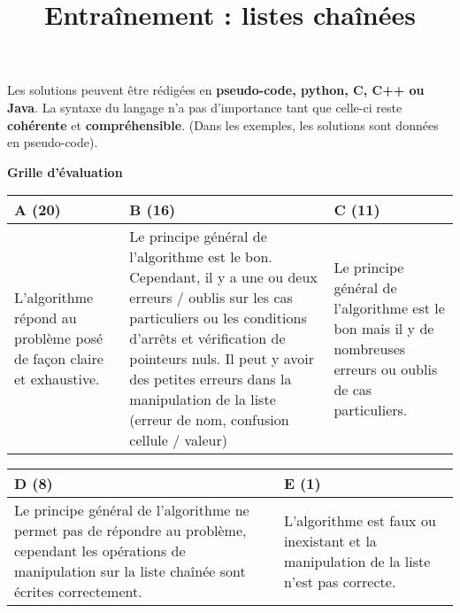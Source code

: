 \documentclass{../cours}
\title{Entraînement : listes chaînées}
\begin{document}
\maketitle

Les solutions peuvent être rédigées en \textbf{pseudo-code, python, C, C++ ou Java}. La syntaxe du langage n'a pas d'importance tant que celle-ci reste \textbf{cohérente} et \textbf{compréhensible}. (Dans les exemples, les solutions sont données en pseudo-code).

\textbf{Grille d'évaluation}

\vspace{0.5cm}

\begin{tabular}{|p{5cm}|p{5cm}|p{5cm}|}
\hline 
A (20) & B (16) & C (11) \\ \hline
\small{L’algorithme répond au problème posé de façon claire et exhaustive.}
&
\small{Le principe général de l'algorithme est le bon. Cependant, il y a une ou deux erreurs / oublis sur les cas particuliers ou les conditions d'arrêts et vérification de pointeurs nuls. Il peut y avoir des petites erreurs dans la manipulation de la liste (erreur de nom, confusion cellule / valeur)}
&
\small{Le principe général de l'algorithme est le bon mais il y de nombreuses erreurs ou oublis de cas particuliers.}

\\ \hline

\end{tabular}

\begin{tabular}{|p{5cm}|p{5cm}|}
\hline
 D (8) & E (1) \\ \hline
\small{Le principe général de l’algorithme ne permet pas de répondre au problème, cependant les opérations de manipulation sur la liste chaînée sont écrites correctement.}
&
\small{L’algorithme est faux ou inexistant et la manipulation de la liste n'est pas correcte.}
\\ \hline
\end{tabular}



\end{document}
